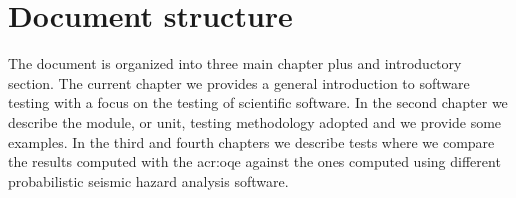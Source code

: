 %
\section{Document structure}
The document is organized into three main chapter plus and introductory 
section. 
%
The current chapter we provides a general introduction to software 
testing with a focus on the testing of scientific software. 
%
In the second chapter we describe the module, or unit, testing 
methodology adopted and we provide some examples. 
%
In the third and fourth chapters we describe tests where we compare 
the results computed with the \gls{acr:oqe} against the ones 
computed using different probabilistic seismic hazard analysis software.
